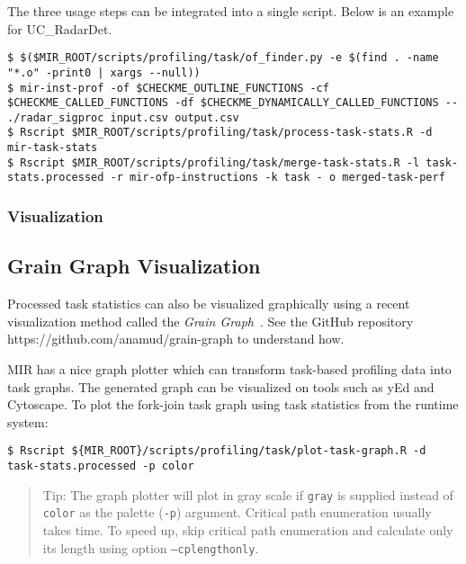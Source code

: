 \documentclass[11pt,a4paper]{article}
\begin{document}
The three usage steps can be integrated into a single script. Below is an example for UC\_RadarDet.

\begin{lstlisting}[style=MyInputStyle]
$ $($MIR_ROOT/scripts/profiling/task/of_finder.py -e $(find . -name "*.o" -print0 | xargs --null))
$ mir-inst-prof -of $CHECKME_OUTLINE_FUNCTIONS -cf $CHECKME_CALLED_FUNCTIONS -df $CHECKME_DYNAMICALLY_CALLED_FUNCTIONS -- ./radar_sigproc input.csv output.csv
$ Rscript $MIR_ROOT/scripts/profiling/task/process-task-stats.R -d mir-task-stats
$ Rscript $MIR_ROOT/scripts/profiling/task/merge-task-stats.R -l task-stats.processed -r mir-ofp-instructions -k task - o merged-task-perf
\end{lstlisting}

\subsubsection{Visualization}\label{sec:visualization}

\subsection{Grain Graph Visualization}
\label{sec:grain_graph_visualization}

Processed task statistics can also be visualized graphically using a recent visualization method called the \textit{Grain Graph}~\cite{muddukrishna2015grain}. See the GitHub repository \textsf{https://github.com/anamud/grain-graph} to understand how.


MIR has a nice graph plotter which can transform task-based profiling data into task graphs. The generated graph can be visualized on tools such as yEd and Cytoscape.  To plot the fork-join task graph using task statistics from the runtime system:

\begin{lstlisting}[style=MyInputStyle]
$ Rscript ${MIR_ROOT}/scripts/profiling/task/plot-task-graph.R -d task-stats.processed -p color
\end{lstlisting}

\begin{framed}
\begin{quote}
Tip: The graph plotter will plot in gray scale if \texttt{gray} is supplied instead of \texttt{color} as the palette (\texttt{-p}) argument. Critical path enumeration usually takes time. To speed up, skip critical path enumeration and calculate only its length using option \texttt{--cplengthonly}.
\end{quote}
\end{framed}
\end{document}
